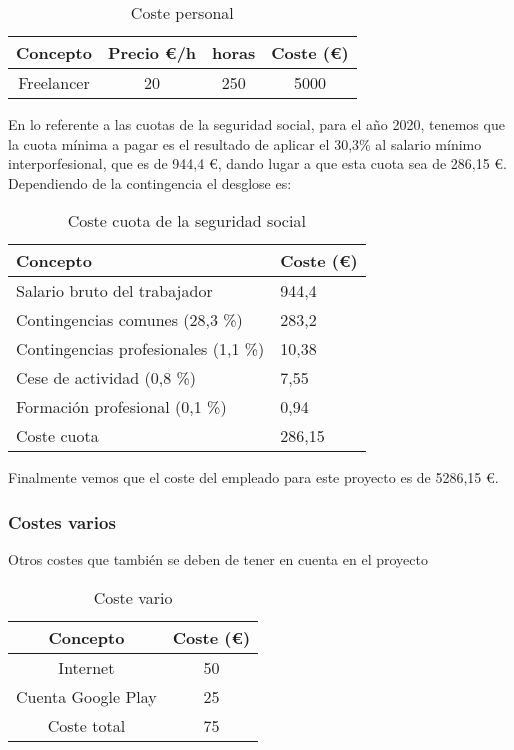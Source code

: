 \begin{table}[H]
	\begin{center}
		\begin{tabular}{cccc}
			\hline
			Concepto                        & Precio €/h	& horas		& Coste (€)  	\\ \hline
			Freelancer					    & 20      		& 250		& 5000			\\ \hline
	
		\end{tabular}
		\caption{Coste personal}
		\label{table:costepersonal}
	\end{center}
\end{table}

En lo referente a las cuotas de la seguridad social, para el año 2020, tenemos que la cuota mínima a pagar es el resultado de aplicar el 30,3\% al salario mínimo interporfesional, que es de 944,4 €, dando lugar a que esta cuota sea de 286,15 €. Dependiendo de la contingencia el desglose es:

\begin{table}[H]
	\begin{center}
		\begin{tabular}{ll}
			\hline
			Concepto                        	& Coste (€) \\ \hline
			Salario bruto del trabajador    	& 944,4      \\
			Contingencias comunes (28,3 \%) 	& 283,2     \\
			Contingencias profesionales (1,1 \%) & 10,38     \\
			Cese de actividad (0,8 \%)          & 7,55        \\
			Formación profesional (0,1 \%)  & 0,94       \\ \hline
			Coste cuota				            & 286,15 
		\end{tabular}
	\caption{Coste cuota de la seguridad social}
	\label{table:costecuota}
	\end{center}
\end{table}

Finalmente vemos que el coste del empleado para este proyecto es de 5286,15 €.

\subsubsection{Costes varios}
Otros costes que también se deben de tener en cuenta en el proyecto

\begin{table}[H]
	\begin{center}
		\begin{tabular}{cc}
			\hline
			Concepto                        & Coste (€)  	\\ \hline
			Internet					    & 50     		\\
			Cuenta Google Play				& 25			\\ \hline
			Coste total            	 		&75			\\ \hline
		\end{tabular}
		\caption{Coste vario}
		\label{table:costevario}
	\end{center}
\end{table}

